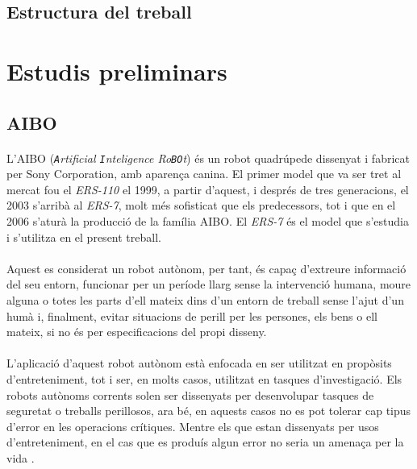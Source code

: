\documentclass[12pt,a4paper,final,twoside]{article}
\begin{document}
\label{Estructura}
\subsection*{Estructura del treball}

\newpage

\label{Estudis-preliminars}
\section{Estudis preliminars}

\label{AIBO}
\subsection{AIBO}
\paragraph{}L'AIBO (\textit{\texttt{A}rtificial \texttt{I}nteligence Ro\texttt{BO}t}) és un robot quadrúpede dissenyat i fabricat per Sony Corporation, amb aparença canina. El primer model que va ser tret al mercat fou el \textit{ERS-110} el 1999, a partir d'aquest, i després de tres generacions, el 2003 s'arribà al \textit{ERS-7}, molt més sofisticat que els predecessors, tot i que en el 2006 s'aturà la producció de la família AIBO. El \textit{ERS-7} és el model que s'estudia i s'utilitza en el present treball.

\paragraph{}Aquest es considerat un robot autònom, per tant, és capaç d'extreure informació del seu entorn, funcionar per un període llarg sense la intervenció humana, moure alguna o totes les parts d'ell mateix dins d'un entorn de treball sense l'ajut d'un humà i, finalment, evitar situacions de perill per les persones, els bens o ell mateix, si no és per especificacions del propi disseny.

\paragraph{}L'aplicació d'aquest robot autònom està enfocada en ser utilitzat en propòsits d'entreteniment, tot i ser, en molts casos, utilitzat en tasques d'investigació. Els robots autònoms corrents solen ser dissenyats per desenvolupar tasques de seguretat o treballs perillosos, ara bé, en aquests casos no es pot tolerar cap tipus d'error en les operacions crítiques. Mentre els que estan dissenyats per usos d'entreteniment, en el cas que es produís algun error no seria un amenaça per la vida \cite{Fujita2000}.
\end{document}
